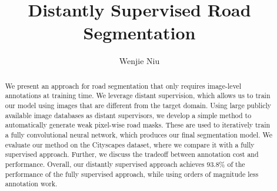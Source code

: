 \documentclass[10pt,twocolumn,letterpaper]{article}
\begin{document}
\title{Distantly Supervised Road Segmentation}
\author{Wenjie Niu}
\maketitle

\begin{abstract}
   We present an approach for road segmentation that only
requires image-level annotations at training time. We leverage
distant supervision, which allows us to train our model
using images that are different from the target domain. Using
large publicly available image databases as distant supervisors,
we develop a simple method to automatically
generate weak pixel-wise road masks. These are used to
iteratively train a fully convolutional neural network, which
produces our final segmentation model. We evaluate our
method on the Cityscapes dataset, where we compare it with
a fully supervised approach. Further, we discuss the tradeoff
between annotation cost and performance. Overall, our
distantly supervised approach achieves 93.8\% of the performance
of the fully supervised approach, while using orders
of magnitude less annotation work. \cite{Tsutsui_2017_ICCV_Workshops}
\end{abstract}
\end{document}
